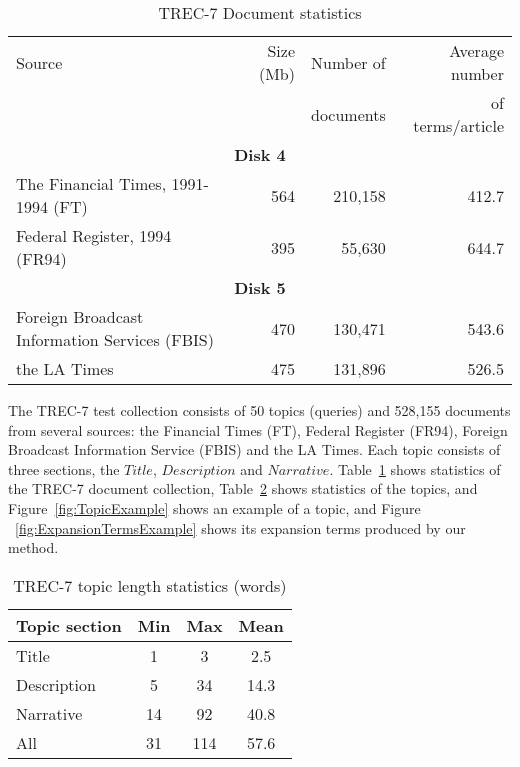 \begin{table}[bht]
  \begin{center}
    \caption{TREC-7 Document statistics}
    \vspace{3mm}
    \begin{tabular}{|l|r|r|r|} \hline
      Source & Size (Mb) & Number of  & Average number \\
             &           &   documents                 & of terms/article \\ \hline \hline
       \multicolumn{4}{|c|}{{\bf Disk 4}} \\ \hline
      The Financial Times, 1991-1994 (FT) & 564 & 210,158 & 412.7 \\ \hline
      Federal Register, 1994 (FR94)  & 395 & 55,630 & 644.7 \\ \hline
        \multicolumn{4}{|c|}{{\bf Disk 5}} \\ \hline
      Foreign Broadcast Information Services (FBIS) & 470 & 130,471 & 543.6 \\ \hline
      the LA Times  & 475 & 131,896 & 526.5 \\ \hline
    \end{tabular}
    \label{tab:TREC7Doc}
  \end{center}
\end{table} 

The TREC-7 test collection consists of
50 topics (queries) and 528,155 documents from several sources:  the Financial Times (FT),
Federal Register (FR94), Foreign Broadcast Information Service (FBIS)
and the LA Times. Each topic consists of
three  sections, the $Title$, $Description$ and $Narrative$.
Table~\ref{tab:TREC7Doc} shows statistics of the TREC-7 document collection,
Table~\ref{tab:TREC7Topic} shows statistics of the topics, and
Figure~\ref{fig:TopicExample} shows an example of a topic, and Figure ~\ref{fig:ExpansionTermsExample} shows its expansion terms produced by our method.

\begin{table}[htbp]
  \begin{center}
    \caption{TREC-7 topic length statistics (words)}
    \label{tab:TREC7Topic}
    \medskip
    \begin{tabular}{|l|c|c|c|}
      \hline
      Topic section & Min & Max & Mean\\
      \hline
      Title&          1&   3&  2.5\\
      Description&    5&  34& 14.3\\
      Narrative&     14&  92& 40.8\\
      All&           31& 114& 57.6\\
      \hline
    \end{tabular}
  \end{center}
\end{table} 



